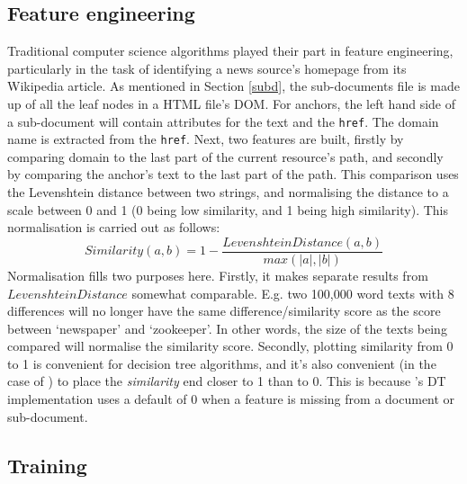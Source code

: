 \subsection{Feature engineering}
Traditional computer science algorithms played their part in feature
engineering, particularly in the task of identifying a news source's
homepage from its Wikipedia article.  As mentioned in Section \ref{subd},
the sub-documents file is made up of all the leaf nodes in a HTML file's
DOM.  For anchors, the left hand side of a sub-document will contain
attributes for the text and the {\tt href}.  The domain name is extracted
from the {\tt href}.  Next, two features are built, firstly by comparing
domain to the last part of the current resource's path, and secondly by comparing the
anchor's text to the last part of the path.  This comparison uses
the Levenshtein distance between two strings, and normalising
the distance to a scale between 0 and 1 (0 being low similarity, and
1 being high similarity).  This normalisation is carried out as follows:
\begin{equation}
    Similarity(a, b) = 1 - \frac{LevenshteinDistance(a, b)}{max(|a|, |b|)}
\end{equation}
Normalisation fills two purposes here.  Firstly, it makes
separate results from $LevenshteinDistance$ somewhat comparable.  E.g.
two 100,000 word texts with 8 differences will no longer have the same
difference/similarity score as the score between `newspaper' and
`zookeeper'.  In other words, the size of the texts being compared will
normalise the similarity score.  Secondly, plotting similarity from
0 to 1 is convenient for decision tree algorithms, and it's also convenient
(in the case of \nr{}) to place the {\it similarity} end closer to 1 than to 0.
This is because \nr{}'s DT implementation uses a default of 0 when a feature
is missing from a document or sub-document.

\subsection{Training\label{training}}
